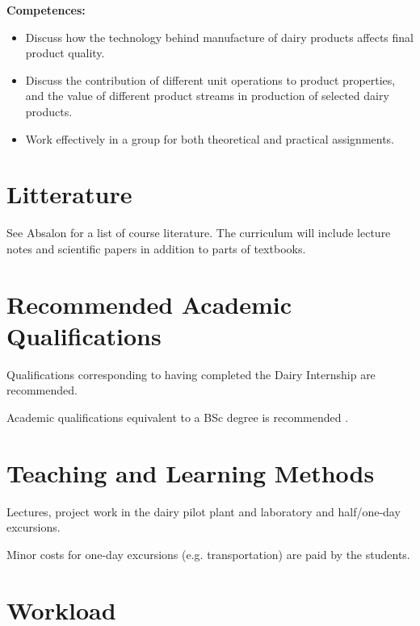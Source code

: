 \textbf{Competences:}
\begin{itemize}
    \item Discuss how the technology behind manufacture of dairy products affects final product quality.
    \item Discuss the contribution of different unit operations to product properties, and the value of different product streams in production of selected dairy products.
    \item Work effectively in a group for both theoretical and practical assignments.
\end{itemize}

\section*{Litterature}
See Absalon for a list of course literature. The curriculum will include lecture notes and scientific papers in addition to parts of textbooks.

\section*{Recommended Academic Qualifications}
Qualifications corresponding to having completed the Dairy Internship are recommended.

Academic qualifications equivalent to a BSc degree is recommended .


\section*{Teaching and Learning Methods}
Lectures, project work in the dairy pilot plant and laboratory and half/one-day excursions.

Minor costs for one-day excursions (e.g. transportation) are paid by the students.

\section*{Workload}

